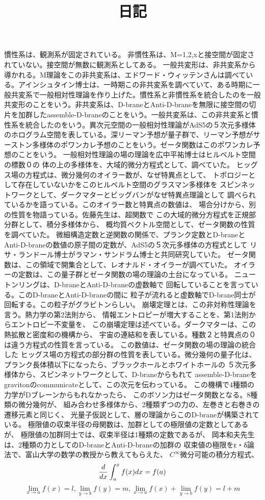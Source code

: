 \documentclass{jsarticle}
\begin{document}
\title{ 日記}
\author{}
\date{}
\maketitle

慣性系は、観測系が固定されている。
非慣性系は、M=1,2,xと接空間が固定されていない。接空間が無数に観測系としてある。
一般共変形は、非共変系から導かれる。M理論をこの非共変系は、エドワード・ウィッテンさんは調べている。アインシュタイン博士は、一時期この非共変系を調べていて、ある時期に一般共変系で一般相対性理論を作り上げた。慣性系と非慣性系を統合したのを一般共変形のことをいう。非共変系は、D-braneとAnti-D-braneを無限に接空間の切片を加群したassemble-D-braneのことをいう。一般共変系は、この非共変系と慣性系を統合したのをいう。異次元空間の一般相対性理論がAdS5の５次元多様体のホログラム空間を表している。深リーマン予想が量子群で、リーマン予想がサーストン多様体のポワンカレ予想のことをいう。ゼータ関数はこのポワンカレ予想のことをいう。
一般相対性理論の場の理論を広中平祐博士はヒルベルト空間の標数０の
体の上の多様体を、大域的微分方程式として、調べていた。
ヒッグス場の方程式は、微分幾何のオイラー数が、なぜ特異点として、
トポロジーとして存在していないかをこのヒルベルト空間のグラスマン多様体を
スピンネットワークとして、ダークマターとビッグバンがなぜ特異点理論として
調べられているかを語っている。このオイラー数と特異点の数値は、
場合分けから、別の性質を物語っている。佐藤先生は、超関数で
この大域的微分方程式を正規部分群として、積分多様体から、
概均質ベクトル空間として、ゼータ関数の性質を調べていた。
微細構造定数と逆関数の関係で、プランク定数とD-braneと
Anti-D-braneの数値の原子間の定数が、AdS5の５次元多様体の方程式として
リサ・ランドール博士がラマン・サンドラム博士と共同研究していた。
ゼータ関数は、この領域で開集合として、レオナルド・オイラーが調べていた。
オイラーの定数は、この量子群とゼータ関数の場の理論の土台になっている。
ニュートンリングは、D-braneとAnti-D-braneの虚数軸で
回転していることを言っている。このD-braneとAnti-D-braneの間に
粒子が流れると虚数軸でD-brane同士が回転する。この粒子がグラビトンらしい。
崩壊定理とは、この非対称性理論を言う。熱力学の第2法則から、
情報エントロピーが増大することを、第1法則からエントロピー不変量を、
この崩壊定理は述べている。ダークマターは、この熱拡散と密度和の機構から、
宇宙の連結和を表している。種数２と特異点の０は違う方程式の性質を言っている。
この数値は、ゼータ関数の場の理論の統合した
ヒッグス場の方程式の部分群の性質を表している。微分幾何の量子化は、
プランク長体積以下になったら、ブラックホールとホワイトホールの
５次元多様体から、スピンネットワークとして、D-braneからもれて
assemble-D-braneをgravitonのcommunicateとして、この次元を伝わっている。
この機構で4種類の力学がDブレーンからもれなかったら、
このボソン力はゼータ関数となる。8種類の微分幾何が、
組み合わせ多様体から、2種類ずつの力の、左巻きと右巻きの遷移元素と同じく、
光量子仮説として、層の理論からこのD-braneが構築されている。
極限値の収束半径の母関数は、加群としての極限値の定数としてあるが、
極限値の加群同士では、収束半径は1種類の定数であるが、
岡本和夫先生は、2種類の力としてのD-braneとAnti-D-braneの加群の
収束値の極限をε・δ論法で、富山大学の数学の教授から教えてもらえた、
$ C^{\infty} $微分可能の積分方程式、
$$ {d \over dx}\int^x_a f(x)dx = f(a) $$
$$ \lim_{x\to a}{f(x)} = l, \lim_{y\to b}
{f(y)} = m, \lim_{x \to a}f(x) + \lim_{y \to b}f(y) = l + m $$
\end{document}
